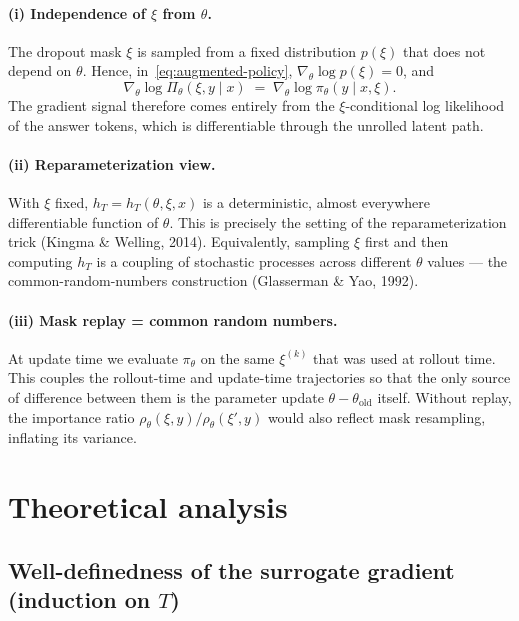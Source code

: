 \documentclass[11pt]{article}
\theoremstyle{definition}
\theoremstyle{remark}
\newcommand{\old}{\mathrm{old}}
\begin{document}
\paragraph{(i) Independence of $\xi$ from $\theta$.}
The dropout mask $\xi$ is sampled from a fixed distribution $p(\xi)$ that does
not depend on $\theta$.  Hence, in~\eqref{eq:augmented-policy},
$\nabla_\theta \log p(\xi) = 0$, and
\begin{equation}
\nabla_\theta \log \Pi_\theta(\xi, y \mid x)
  \;=\;
\nabla_\theta \log \pi_\theta(y \mid x, \xi).
\label{eq:score-reduces}
\end{equation}
The gradient signal therefore comes entirely from the $\xi$-conditional log
likelihood of the answer tokens, which is differentiable through the
unrolled latent path.

\paragraph{(ii) Reparameterization view.}
With $\xi$ fixed, $h_T = h_T(\theta, \xi, x)$ is a deterministic, almost
everywhere differentiable function of $\theta$.  This is precisely the setting
of the reparameterization trick (Kingma \& Welling, 2014).  Equivalently,
sampling $\xi$ first and then computing $h_T$ is a coupling of stochastic
processes across different $\theta$ values --- the common-random-numbers
construction (Glasserman \& Yao, 1992).

\paragraph{(iii) Mask replay = common random numbers.}
At update time we evaluate $\pi_\theta$ on the same $\xi^{(k)}$ that was used
at rollout time.  This couples the rollout-time and update-time trajectories
so that the only source of difference between them is the parameter update
$\theta - \theta_\old$ itself.  Without replay, the importance ratio
$\rho_\theta(\xi, y) / \rho_\theta(\xi', y)$ would also reflect mask
resampling, inflating its variance.

\section{Theoretical analysis}

\subsection{Well-definedness of the surrogate gradient (induction on $T$)}
\end{document}
